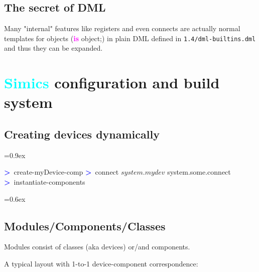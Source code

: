\documentclass[8pt]{extarticle}
\newenvironment{code}[1][]{%
\begin{prebox}[#1]\obeylines%
\fontdimen2\font=0.9ex%
}{%
\end{prebox}%
\fontdimen2\font=0.6ex%
}
\newcommand{\cod}[1]{\colorbox{green!15}{#1}}
\newcommand{\sprompt}{\textcolor{blue}{\textbf{>}\ }}
\newcommand{\kw}[1]{\textcolor{magenta}{\textbf{#1}}}
\newcommand{\p}[1]{\textit{\large#1}}
\newcommand{\Simics}{\textcolor{cyan}{\textbf{Simics}}}
\begin{document}
\begin{multicols*}{3}
\subsection{The secret of DML}
        Many "internal" features like registers and even connects are actually
        normal templates for objects (\cod{\kw{is} object;}) in plain DML
        defined in \texttt{1.4/dml-builtins.dml} and thus they can be expanded.

\newpage


\section{\Simics{} configuration and build system}

\subsection{Creating devices dynamically}
\begin{code}
\sprompt create-myDevice-comp
\sprompt connect $system.mydev$ system.some.connect
\sprompt instantiate-components
\end{code}

\subsection{Modules/Components/Classes}
Modules consist of classes (aka devices) or/and components.
%
%
%


A typical layout with 1-to-1 device-component correspondence:

\end{multicols*}
\end{document}

